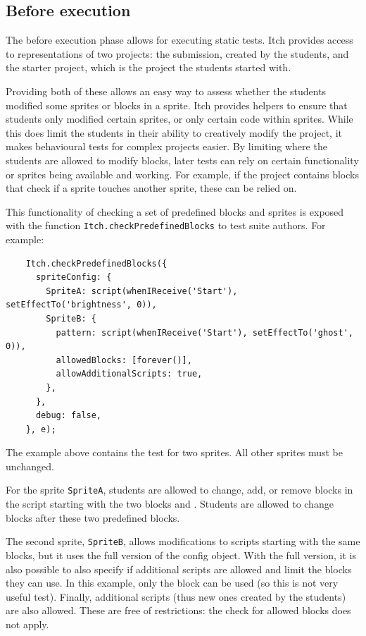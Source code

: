 \documentclass[../main]{subfiles}
\begin{document}
\subsection{Before execution}\label{subsec:before-execution}

The before execution phase allows for executing static tests.
Itch provides access to representations of two projects: the submission, created by the students, and the starter project, which is the project the students started with.

Providing both of these allows an easy way to assess whether the students modified some sprites or blocks in a sprite.
Itch provides helpers to ensure that students only modified certain sprites, or only certain code within sprites.
While this does limit the students in their ability to creatively modify the project, it makes behavioural tests for complex projects easier.
By limiting where the students are allowed to modify blocks, later tests can rely on certain functionality or sprites being available and working.
For example, if the project contains blocks that check if a sprite touches another sprite, these can be relied on.

This functionality of checking a set of predefined blocks and sprites is exposed with the function \texttt{Itch.checkPredefinedBlocks} to test suite authors.
For example:

\begin{verbatim}
    Itch.checkPredefinedBlocks({
      spriteConfig: {
        SpriteA: script(whenIReceive('Start'), setEffectTo('brightness', 0)),
        SpriteB: {
          pattern: script(whenIReceive('Start'), setEffectTo('ghost', 0)),
          allowedBlocks: [forever()],
          allowAdditionalScripts: true,
        },
      },
      debug: false,
    }, e);
\end{verbatim}

The example above contains the test for two sprites.
All other sprites must be unchanged.

For the sprite \texttt{SpriteA}, students are allowed to change, add, or remove blocks in the script starting with the two blocks  and .
Students are allowed to change blocks after these two predefined blocks.

The second sprite, \texttt{SpriteB}, allows modifications to scripts starting with the same blocks, but it uses the full version of the config object.
With the full version, it is also possible to also specify if additional scripts are allowed and limit the blocks they can use.
In this example, only the  block can be used (so this is not very useful test).
Finally, additional scripts (thus new ones created by the students) are also allowed.
These are free of restrictions: the check for allowed blocks does not apply.
\end{document}
